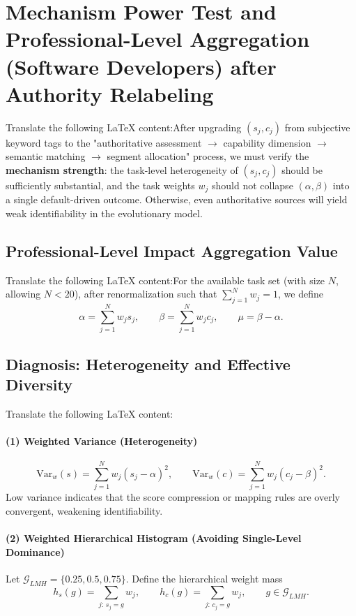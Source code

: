 \section{Mechanism Power Test and Professional-Level Aggregation (Software Developers) after Authority Relabeling}Translate the following LaTeX content:After upgrading $(s_j,c_j)$ from subjective keyword tags to the "authoritative assessment $\rightarrow$ capability dimension $\rightarrow$ semantic matching $\rightarrow$ segment allocation" process,  
we must verify the \textbf{mechanism strength}: the task-level heterogeneity of $(s_j,c_j)$ should be sufficiently substantial, and the task weights $w_j$ should not collapse $(\alpha,\beta)$ into a single default-driven outcome.  
Otherwise, even authoritative sources will yield weak identifiability in the evolutionary model.\subsection{Professional-Level Impact Aggregation Value}Translate the following LaTeX content:For the available task set (with size $N$, allowing $N<20$), after renormalization such that $\sum_{j=1}^{N} w_j=1$, we define
\begin{equation}
    \alpha=\sum_{j=1}^{N} w_j s_j,\qquad
    \beta=\sum_{j=1}^{N} w_j c_j,\qquad
    \mu=\beta-\alpha.
\end{equation}\subsection{Diagnosis: Heterogeneity and Effective Diversity}Translate the following LaTeX content:\paragraph{(1) Weighted Variance (Heterogeneity)}\begin{equation}
    \mathrm{Var}_w(s)=\sum_{j=1}^{N} w_j (s_j-\alpha)^2,\qquad
    \mathrm{Var}_w(c)=\sum_{j=1}^{N} w_j (c_j-\beta)^2.
\end{equation}
Low variance indicates that the score compression or mapping rules are overly convergent, weakening identifiability.\paragraph{(2) Weighted Hierarchical Histogram (Avoiding Single-Level Dominance)}Let $\mathcal{G}_{LMH}=\{0.25,0.5,0.75\}$. Define the hierarchical weight mass
\begin{equation}
    h_s(g)=\sum_{j:\,s_j=g} w_j,\qquad
    h_c(g)=\sum_{j:\,c_j=g} w_j,\qquad g\in\mathcal{G}_{LMH}.
\end{equation}
